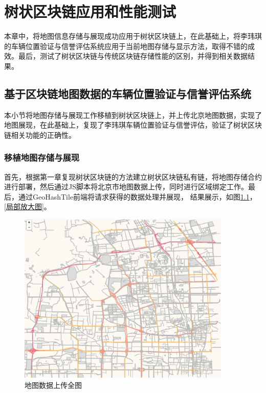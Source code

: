 %
%
%
%
%
%
\chapter{树状区块链应用和性能测试}
本章中，将地图信息存储与展现成功应用于树状区块链上，在此基础上，将李玮琪的车辆位置验证与信誉评估系统\cite{lposition}应用于当前地图存储与显示方法，取得不错的成效。最后，测试了树状区块链与传统区块链存储性能的区别，并得到相关数据结果。

\section{基于区块链地图数据的车辆位置验证与信誉评估系统}
本小节将地图存储与展现工作移植到树状区块链上，并上传北京地图数据，实现了地图展现，在此基础上，复现了李玮琪车辆位置验证与信誉评估\cite{lposition}，验证了树状区块链相关功能的正确性。

\subsection{移植地图存储与展现}
首先，根据第一章复现树状区块链的方法建立树状区块链私有链，将地图存储合约进行部署，然后通过JS脚本将北京市地图数据上传，同时进行区域绑定工作。最后，通过GeoHashTile前端将请求获得的数据处理并展现， 结果展示，如图\ref{地图数据上传全图}，\ref{局部放大图}。
\begin{figure}[!htb]
    \centering
    \includegraphics[width=4in]{images/7.png}
    \caption{地图数据上传全图}\label{地图数据上传全图} 
\end{figure}


